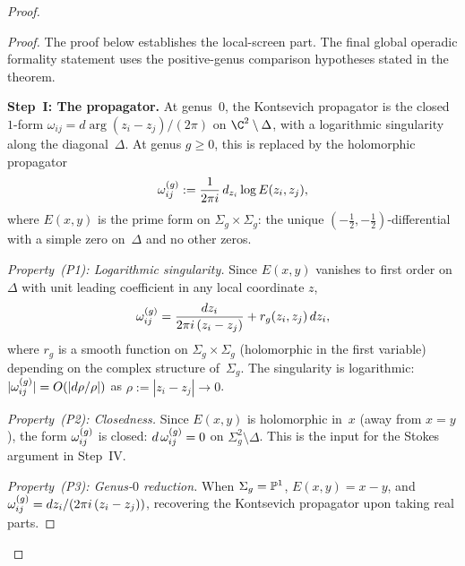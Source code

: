\begin{proof}
\begin{proof}
The proof below establishes the local-screen part. The final
global operadic formality statement uses the positive-genus
comparison hypotheses stated in the theorem.

\bigskip\noindent
\textbf{Step~I: The propagator.}
At genus~$0$, the Kontsevich propagator is the closed $1$-form
$\omega_{ij} = d\arg(z_i - z_j) / (2\pi)$
on $\C^2 \setminus \Delta$, with a logarithmic singularity
along the diagonal~$\Delta$. At genus $g \ge 0$, this is replaced
by the holomorphic propagator
\begin{equation}\label{eq:genus-g-propagator-formal}
 \omega^{(g)}_{ij}
 := \frac{1}{2\pi i}\, d_{z_i} \log E(z_i, z_j),
\end{equation}
where $E(x,y)$ is the prime form on $\Sigma_g \times \Sigma_g$:
the unique $(-\tfrac{1}{2}, -\tfrac{1}{2})$-differential
with a simple zero on~$\Delta$ and no other zeros.

\smallskip\noindent
\emph{Property~(P1): Logarithmic singularity.}
Since $E(x,y)$ vanishes to first order on~$\Delta$ with
unit leading coefficient in any local coordinate $z$,
\begin{equation}\label{eq:propagator-local-expansion}
 \omega^{(g)}_{ij}
 = \frac{dz_i}{2\pi i\,(z_i - z_j)}
 + r_g(z_i, z_j)\, dz_i,
\end{equation}
where $r_g$ is a smooth function on
$\Sigma_g \times \Sigma_g$ (holomorphic in the first variable)
depending on the complex structure of~$\Sigma_g$. The
singularity is logarithmic: $|\omega^{(g)}_{ij}| = O(|d\rho / \rho|)$
as $\rho := |z_i - z_j| \to 0$.

\smallskip\noindent
\emph{Property~(P2): Closedness.}
Since $E(x,y)$ is holomorphic in~$x$ (away from $x = y$),
the form $\omega^{(g)}_{ij}$ is closed:
$d\, \omega^{(g)}_{ij} = 0$ on $\Sigma_g^2 \setminus \Delta$.
This is the input for the Stokes argument in Step~IV.

\smallskip\noindent
\emph{Property~(P3): Genus-$0$ reduction.}
When $\Sigma_g = \mathbb{P}^1$, $E(x,y) = x - y$, and
$\omega^{(g)}_{ij} = dz_i / (2\pi i\,(z_i - z_j))$, recovering
the Kontsevich propagator upon taking real parts.


\end{proof}
\end{proof}
